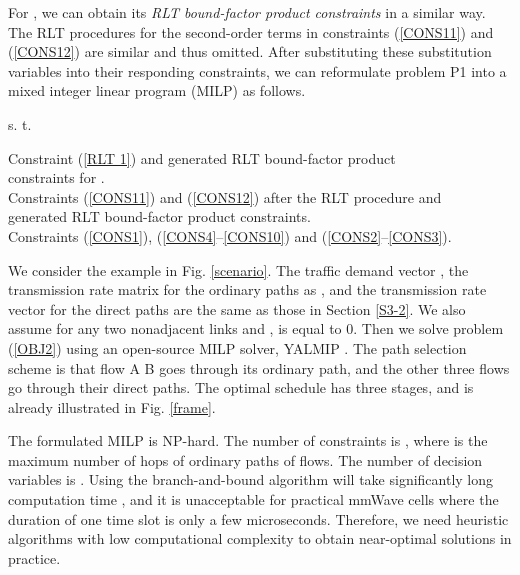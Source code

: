 \documentclass[journal]{IEEEtran}
\begin{document}
For , we can obtain its \emph{RLT bound-factor product constraints} in a similar way. The
RLT procedures for the second-order terms in constraints (\ref{CONS11}) and (\ref{CONS12}) are
similar and thus omitted. After substituting these substitution variables into their responding
constraints, we can reformulate problem P1 into a mixed integer linear program (MILP) as
follows.


\hspace{0cm}s. t.




\hspace{0.15cm}Constraint (\ref{RLT 1}) and generated RLT bound-factor product \\

\hspace{0.15cm}constraints for .\\

\hspace{0.15cm}Constraints (\ref{CONS11}) and (\ref{CONS12}) after the RLT procedure and \\

\hspace{0.15cm}generated RLT bound-factor product constraints.\\

\hspace{0.15cm}Constraints (\ref{CONS1}), (\ref{CONS4}--\ref{CONS10}) and
(\ref{CONS2}--\ref{CONS3}).



\vbox{}



We consider the example in Fig. \ref{scenario}. The traffic demand vector , the
transmission rate matrix for the ordinary paths as , and the transmission rate vector
for the direct paths  are the same as those in Section \ref{S3-2}. We also assume for
any two nonadjacent links  and ,  is equal to 0. Then we
solve problem (\ref{OBJ2}) using an open-source MILP solver, YALMIP \cite{yalmip}. The path
selection scheme is that flow A  B goes through its ordinary path, and the other three flows
go through their direct paths. The optimal schedule has three stages, and is already illustrated in
Fig. \ref{frame}.

The formulated MILP is NP-hard. The number of constraints is , where
 is the maximum number of hops of ordinary paths of flows. The number of decision
variables is . Using the branch-and-bound algorithm will take
significantly long computation time \cite{mao}, and it is unacceptable for practical mmWave cells
where the duration of one time slot is only a few microseconds. Therefore, we need heuristic
algorithms with low computational complexity to obtain near-optimal solutions in practice.
\end{document}

